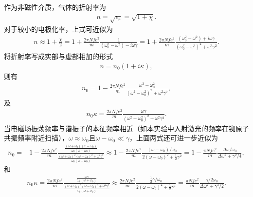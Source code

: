 \documentclass{assignment}
\begin{document}
作为非磁性介质，气体的折射率为
\begin{align}
    n=\sqrt{\epsilon_r}=\sqrt{1+\chi}.
\end{align}
对于较小的电极化率，上式可近似为
\begin{align}
    n\approx 1+\frac{\chi}{2}=1+\frac{2\pi Nfe^2}{m}\frac{1}{(\omega_0^2-\omega^2)-i\omega\gamma}=1+\frac{2\pi Nfe^2}{m}\frac{(\omega_0^2-\omega^2)+i\omega\gamma}{(\omega_0^2-\omega^2)^2+\omega^2\gamma^2}.
\end{align}
将折射率写成实部与虚部相加的形式
\begin{align}
    n=n_0(1+i\kappa),
\end{align}
则有
\begin{align}
    n_0=1-\frac{2\pi Nfe^2}{m}\frac{\omega^2-\omega_0^2}{(\omega^2-\omega_0^2)^2+\omega^2\gamma^2},
\end{align}
及
\begin{align}
    n_0\kappa=\frac{2\pi Nfe^2}{m}\frac{\omega\gamma}{(\omega^2-\omega_0^2)^2+\omega^2\gamma^2}.
\end{align}
当电磁场振荡频率与谐振子的本征频率相近（如本实验中入射激光的频率在铷原子共振频率附近扫描），$\omega\approx\omega_0$且$\omega-\omega_0\ll\gamma$，上面两式还可进一步近似为
\begin{align}
    n_0=&1-\frac{2\pi Nfe^2}{m}\frac{\frac{(\omega+\omega_0)(\omega-\omega_0)}{\omega_0(\omega+\omega_0)}}{\frac{(\omega+\omega_0)^2(\omega-\omega_0)^2+\omega^2\gamma^2}{\omega_0(\omega+\omega_0)}}\approx 1-\frac{2\pi Nfe^2}{m}\frac{(\omega-\omega_0)/\omega_0}{2(\omega-\omega_0)^2+\frac{1}{2}\gamma^2}=1-\frac{\pi Nfe^2}{m}\frac{\Delta\omega/\omega_0}{\Delta\omega^2+\gamma^2/4},
\end{align}
和
\begin{align}
    n_0\kappa=\frac{2\pi Nfe^2}{m}\frac{\frac{\omega\gamma}{\omega_0(\omega+\omega_0)}}{\frac{(\omega+\omega_0)^2(\omega-\omega_0)^2+\omega^2\gamma^2}{\omega_0(\omega+\omega_0)}}\approx\frac{2\pi Nfe^2}{m}\frac{\frac{1}{2}\gamma/\omega_0}{2(\omega-\omega_0)^2+\frac{1}{2}\gamma^2}=\frac{\pi Nfe^2}{m}\frac{\gamma/2\omega_0}{\Delta\omega^2+\gamma^4/2}.
\end{align}
\end{document}
